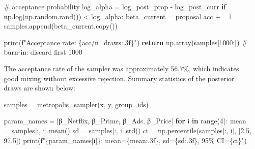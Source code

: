 \documentclass[
  letterpaper,
  DIV=11,
  numbers=noendperiod]{scrartcl}
\newenvironment{Shaded}{\begin{snugshade}}{\end{snugshade}}
\newcommand{\BuiltInTok}[1]{\textcolor[rgb]{0.00,0.23,0.31}{#1}}
\newcommand{\CommentTok}[1]{\textcolor[rgb]{0.37,0.37,0.37}{#1}}
\newcommand{\ControlFlowTok}[1]{\textcolor[rgb]{0.00,0.23,0.31}{\textbf{#1}}}
\newcommand{\DecValTok}[1]{\textcolor[rgb]{0.68,0.00,0.00}{#1}}
\newcommand{\FloatTok}[1]{\textcolor[rgb]{0.68,0.00,0.00}{#1}}
\newcommand{\KeywordTok}[1]{\textcolor[rgb]{0.00,0.23,0.31}{\textbf{#1}}}
\newcommand{\NormalTok}[1]{\textcolor[rgb]{0.00,0.23,0.31}{#1}}
\newcommand{\OperatorTok}[1]{\textcolor[rgb]{0.37,0.37,0.37}{#1}}
\newcommand{\SpecialCharTok}[1]{\textcolor[rgb]{0.37,0.37,0.37}{#1}}
\newcommand{\SpecialStringTok}[1]{\textcolor[rgb]{0.13,0.47,0.30}{#1}}
\newcommand{\StringTok}[1]{\textcolor[rgb]{0.13,0.47,0.30}{#1}}
\begin{document}
\begin{Shaded}
\begin{Highlighting}[]
        \CommentTok{\# acceptance probability}
\NormalTok{        log\_alpha }\OperatorTok{=}\NormalTok{ log\_post\_prop }\OperatorTok{{-}}\NormalTok{ log\_post\_curr}
        \ControlFlowTok{if}\NormalTok{ np.log(np.random.rand()) }\OperatorTok{\textless{}}\NormalTok{ log\_alpha:}
\NormalTok{            beta\_current }\OperatorTok{=}\NormalTok{ proposal}
\NormalTok{            acc }\OperatorTok{+=} \DecValTok{1}
\NormalTok{        samples.append(beta\_current.copy())}

    \BuiltInTok{print}\NormalTok{(}\SpecialStringTok{f"Acceptance rate: }\SpecialCharTok{\{}\NormalTok{acc}\OperatorTok{/}\NormalTok{n\_draws}\SpecialCharTok{:.3f\}}\SpecialStringTok{"}\NormalTok{)}
    \ControlFlowTok{return}\NormalTok{ np.array(samples[}\DecValTok{1000}\NormalTok{:])  }\CommentTok{\# burn{-}in: discard first 1000}
\end{Highlighting}
\end{Shaded}

The acceptance rate of the sampler was approximately 56.7\%, which
indicates good mixing without excessive rejection. Summary statistics of
the posterior draws are shown below:

\begin{Shaded}
\begin{Highlighting}[]
\NormalTok{samples }\OperatorTok{=}\NormalTok{ metropolis\_sampler(x, y, group\_ids)}

\NormalTok{param\_names }\OperatorTok{=}\NormalTok{ [}\StringTok{\textquotesingle{}β\_Netflix\textquotesingle{}}\NormalTok{, }\StringTok{\textquotesingle{}β\_Prime\textquotesingle{}}\NormalTok{, }\StringTok{\textquotesingle{}β\_Ads\textquotesingle{}}\NormalTok{, }\StringTok{\textquotesingle{}β\_Price\textquotesingle{}}\NormalTok{]}
\ControlFlowTok{for}\NormalTok{ i }\KeywordTok{in} \BuiltInTok{range}\NormalTok{(}\DecValTok{4}\NormalTok{):}
\NormalTok{    mean }\OperatorTok{=}\NormalTok{ samples[:, i].mean()}
\NormalTok{    sd }\OperatorTok{=}\NormalTok{ samples[:, i].std()}
\NormalTok{    ci }\OperatorTok{=}\NormalTok{ np.percentile(samples[:, i], [}\FloatTok{2.5}\NormalTok{, }\FloatTok{97.5}\NormalTok{])}
    \BuiltInTok{print}\NormalTok{(}\SpecialStringTok{f"}\SpecialCharTok{\{}\NormalTok{param\_names[i]}\SpecialCharTok{\}}\SpecialStringTok{: mean=}\SpecialCharTok{\{}\NormalTok{mean}\SpecialCharTok{:.3f\}}\SpecialStringTok{, sd=}\SpecialCharTok{\{}\NormalTok{sd}\SpecialCharTok{:.3f\}}\SpecialStringTok{, 95\% CI=}\SpecialCharTok{\{}\NormalTok{ci}\SpecialCharTok{\}}\SpecialStringTok{"}\NormalTok{)}
\end{Highlighting}
\end{Shaded}
\end{document}
